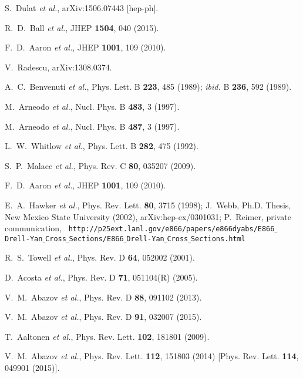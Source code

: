 \documentclass[aps,prd,amsmath,preprint]{revtex4}
\begin{document}
\begin{thebibliography}{99}
S.~Dulat {\it et al.},
arXiv:1506.07443 [hep-ph].

%

R.~D.~Ball {\it et al.},
JHEP {\bf 1504}, 040 (2015).

F.~D.~Aaron {\it et al.},
JHEP {\bf 1001}, 109 (2010).

V.~Radescu, arXiv:1308.0374.

A.~C.~Benvenuti {\it et al.},
Phys. Lett. B {\bf 223}, 485 (1989);
{\it ibid.} B {\bf 236}, 592 (1989).
           
M.~Arneodo {\it et al.},
Nucl. Phys. B {\bf 483}, 3 (1997).

M.~Arneodo {\it et al.},
Nucl. Phys. B {\bf 487}, 3 (1997).

L.~W.~Whitlow {\it et al.},
Phys. Lett. B {\bf 282}, 475 (1992).

S.~P.~Malace {\it et al.},
Phys. Rev. C {\bf 80}, 035207 (2009).

F.~D.~Aaron {\it et al.},
JHEP {\bf 1001}, 109 (2010).

E.~A.~Hawker {\it et al.},
Phys. Rev. Lett. {\bf 80}, 3715 (1998);
%
J.~Webb,
Ph.D. Thesis, New Mexico State University (2002),
arXiv:hep-ex/0301031;
% 
P.~Reimer,
private communication,
%
{\tt
http://p25ext.lanl.gov/e866/papers/e866dyabs/E866$\_$Drell-Yan$\_$Cross$\_$Sections/E866$\_$Drell-Yan$\_$Cross$\_$Sections.html}

R.~S.~Towell {\it et al.},
Phys. Rev. D {\bf 64}, 052002 (2001).

D.~Acosta {\it et al.},
Phys. Rev. D {\bf 71}, 051104(R) (2005).

V.~M.~Abazov {\it et al.},
Phys. Rev. D {\bf 88}, 091102 (2013).

V.~M.~Abazov {\it et al.},
Phys. Rev. D {\bf 91}, 032007 (2015).

T.~Aaltonen {\it et al.},
Phys. Rev. Lett. {\bf 102}, 181801 (2009).

V.~M.~Abazov {\it et al.},
Phys. Rev. Lett. {\bf 112}, 151803 (2014)
[Phys. Rev. Lett. {\bf 114}, 049901 (2015)].


\end{thebibliography}
\end{document}
